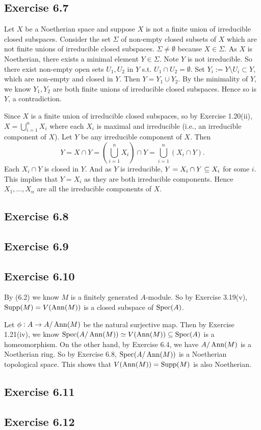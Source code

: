 \documentclass[../A&M.tex]{subfiles}
\begin{document}
\subsection*{Exercise 6.7}

Let $X$ be a Noetherian space and suppose $X$ is not a finite union of irreducible closed subspaces. Consider the set $\Sigma$ of non-empty closed subsets of $X$ which are not finite unions of irreducible closed subspaces. $\Sigma \neq \emptyset$ because $X\in\Sigma$. As $X$ is Noetherian, there exists a minimal element $Y\in\Sigma$. Note $Y$ is not irreducible. So there exist non-empty open sets $U_1,U_2$ in $Y$ s.t. $U_1 \cap U_2 = \emptyset$. Set $Y_i := Y \setminus U_i \subset Y$, which are non-empty and closed in $Y$. Then $Y = Y_1 \cup Y_2$. By the minimality of $Y$, we know $Y_1,Y_2$ are both finite unions of irreducible closed subspaces. Hence so is $Y$, a contradiction.

Since $X$ is a finite union of irreducible closed subspaces, so by Exercise 1.20(ii), $X = \bigcup_{i=1}^n X_i$ where each $X_i$ is maximal and irreducible (i.e., an irreducible component of $X$). Let $Y$ be any irreducible component of $X$. Then
$$
Y = X \cap Y = \left( \bigcup_{i=1}^n X_i \right) \cap Y = \bigcup_{i=1}^n (X_i \cap Y).
$$
Each $X_i \cap Y$ is closed in $Y$. And as $Y$ is irreducible, $Y = X_i \cap Y \subseteq X_i$ for some $i$. This implies that $Y = X_i$ as they are both irreducible components. Hence $X_1,\ldots,X_n$ are all the irreducible components of $X$.

\subsection*{Exercise 6.8}

\subsection*{Exercise 6.9}

\subsection*{Exercise 6.10}

By (6.2) we know $M$ is a finitely generated $A$-module. So by Exercise 3.19(v), $\operatorname{Supp}(M) = V(\operatorname{Ann}(M))$ is a closed subspace of $\operatorname{Spec}(A)$.

Let $\phi: A \to A/\operatorname{Ann}(M)$ be the natural surjective map. Then by Exercise 1.21(iv), we know $\operatorname{Spec}(A/\operatorname{Ann}(M)) \simeq V(\operatorname{Ann}(M)) \subseteq \operatorname{Spec}(A)$ is a homeomorphism. On the other hand, by Exercise 6.4, we have $A/\operatorname{Ann}(M)$ is a Noetherian ring. So by Exercise 6.8, $\operatorname{Spec}(A/\operatorname{Ann}(M))$ is a Noetherian topological space. This shows that $V(\operatorname{Ann}(M)) = \operatorname{Supp}(M)$ is also Noetherian.

\subsection*{Exercise 6.11}

\subsection*{Exercise 6.12}
\phantom{}
\end{document}
